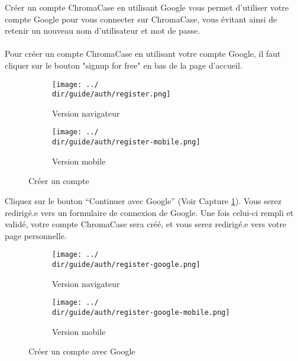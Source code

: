 Créer un compte ChromaCase en utilisant Google vous permet d’utiliser votre compte Google pour vous connecter sur ChromaCase, vous évitant ainsi de retenir un nouveau nom d’utilisateur et mot de passe.
\\\\
Pour créer un compte ChromaCase en utilisant votre compte Google, il faut cliquer sur le bouton "signup for free" en bas de la page d'accueil.

\begin{figure}[H]
	\begin{subfigure}[b]{0.7\textwidth}
		\texttt{[image: ../\\dir/guide/auth/register.png]}
		\caption{Version navigateur}
	\end{subfigure}
	\begin{subfigure}[b]{0.25\textwidth}
		\texttt{[image: ../\\dir/guide/auth/register-mobile.png]}
		\caption{Version mobile}
	\end{subfigure}
	\caption{Créer un compte}
\end{figure}

Cliquez sur le bouton “Continuer avec Google” (Voir Capture \ref{fig:signup-google}). Vous serez redirigé.e vers un formulaire de connexion de Google. Une fois celui-ci rempli et validé, votre compte ChromaCase sera créé, et vous serez redirigé.e vers votre page personnelle.

\begin{figure}[H]
	\begin{subfigure}[b]{0.7\textwidth}
		\texttt{[image: ../\\dir/guide/auth/register-google.png]}
		\caption{Version navigateur}
	\end{subfigure}
	\begin{subfigure}[b]{0.25\textwidth}
		\texttt{[image: ../\\dir/guide/auth/register-google-mobile.png]}
		\caption{Version mobile}
	\end{subfigure}
	\caption{Créer un compte avec Google}
	\label{fig:signup-google}
\end{figure}